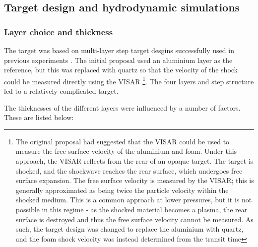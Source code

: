 \subsection{Target design and hydrodynamic simulations} \label{Target Design}

\subsubsection{Layer choice and thickness}

The target was based on multi-layer step target desgins successfully used in previous experiments \cite{Falk2014a, Falk2020}. The initial proposal used an aluminium layer as the reference, but this was replaced with quartz so that the velocity of the shock could be measured directly using the VISAR \footnote{The original proposal had suggested that the VISAR could be used to measure the free surface velocity of the aluminium and foam. Under this approach, the VISAR reflects from the rear of an opaque target. The target is shocked, and the shockwave reaches the rear surface, which undergoes free surface expansion. The free surface velocity is measured by the VISAR; this is generally approximated as being twice the particle velocity within the shocked medium. This is a common approach at lower pressures, but it is not possible in this regime - as the shocked material becomes a plasma, the rear surface is destroyed and thus the free surface velocity cannot be measured. As such, the target design was changed to replace the aluminium with quartz, and the foam shock velocity was instead determined from the transit time}. The four layers and step structure led to a relatively complicated target.

The thicknesses of the different layers were influenced by a number of factors. These are listed below:


